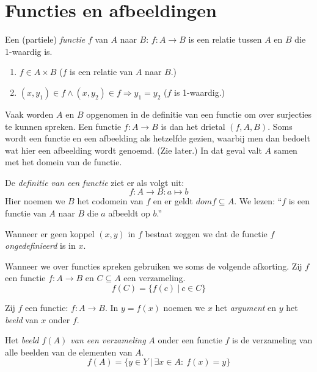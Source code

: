 \documentclass[main.tex]{subfiles}
\begin{document}
\chapter{Functies en afbeeldingen}
\label{cha:functies-en-afbeeldingen}

\begin{de}
  Een (partiele) \emph{functie} $f$ van $A$ naar $B$: $f: A \rightarrow B$ is een relatie tussen $A$ en $B$ die 1-waardig is.
  \begin{enumerate}
  \item $f \in A \times B$ ($f$ is een relatie van $A$ naar $B$.)
  \item $(x,y_{1}) \in f \wedge (x,y_{2}) \in f \Rightarrow y_{1} = y_{2}$ ($f$ is 1-waardig.)
  \end{enumerate}
  Vaak worden $A$ en $B$ opgenomen in de definitie van een functie om over surjecties te kunnen spreken. Een functie $f: A \rightarrow B$ is dan het drietal $(f,A,B)$. Soms wordt een functie en een afbeelding als hetzelfde gezien, waarbij men dan bedoelt wat hier een afbeelding wordt genoemd. (Zie later.) In dat geval valt $A$ samen met het domein van de functie.
\end{de}

\begin{de}
  De \emph{definitie van een functie} ziet er als volgt uit:
  \[ f: A \rightarrow B: a \mapsto b \]
  Hier noemen we $B$ het codomein van $f$ en er geldt $dom f \subseteq A$.
  We lezen: ``$f$ is een functie van $A$ naar $B$ die $a$ afbeeldt op $b$.''
\end{de}

\begin{de}
  Wanneer er geen koppel $(x,y)$ in $f$ bestaat zeggen we dat de functie $f$ \emph{ongedefinieerd} is in $x$.
\end{de}

\begin{de}
  Wanneer we over functies spreken gebruiken we soms de volgende afkorting. Zij $f$ een functie $f: A \rightarrow B$ en $C \subseteq A$ een verzameling.
  \[ f(C) = \{ f(c)\ |\ c \in C \} \] 
\end{de}

\begin{de}
  Zij $f$ een functie: $f: A \rightarrow B$. 
  In $y = f(x)$ noemen we $x$ het \emph{argument} en $y$ het \emph{beeld} van $x$ onder $f$.
\end{de}

\begin{de}
  Het \emph{beeld $f(A)$ van een verzameling} $A$ onder een functie $f$ is de verzameling van alle beelden van de elementen van $A$.
  \[ f(A) = \{ y \in Y \ |\ \exists x \in A:\ f(x) = y \} \]
\end{de}
\end{document}
